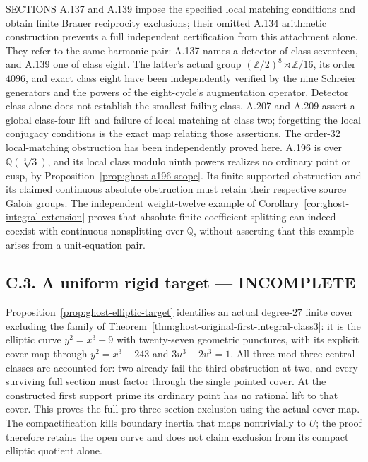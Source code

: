 SECTIONS A.137 and A.139 impose the specified local matching
conditions and obtain finite Brauer reciprocity exclusions;
their omitted A.134 arithmetic construction prevents a full
independent certification from this attachment alone. They
refer to the same harmonic pair: A.137 names a detector of
class seventeen, and A.139 one of class eight. The latter's
actual group \((\mathbb Z/2)^8\rtimes\mathbb Z/16\), its
order \(4096\), and exact class eight have been independently
verified by the nine Schreier generators and the powers of
the eight-cycle's augmentation operator. Detector class alone
does not establish the smallest failing class. A.207
and A.209 assert a global class-four lift and failure of local
matching at class two; forgetting the local conjugacy
conditions is the exact map relating those assertions. The
order-32 local-matching obstruction has been independently
proved here. A.196 is over \(\mathbb Q(\sqrt[3]3)\), and
its local class modulo ninth powers realizes no ordinary
point or cusp, by Proposition~\ref{prop:ghost-a196-scope}.
Its finite supported obstruction and its claimed continuous
absolute obstruction must retain their respective source
Galois groups. The independent weight-twelve example of
Corollary~\ref{cor:ghost-integral-extension} proves that
absolute finite coefficient splitting can indeed coexist with
continuous nonsplitting over \(\mathbb Q\), without asserting
that this example arises from a unit-equation pair.

\subsection*{C.3. A uniform rigid target --- INCOMPLETE}
\label{task:ghost-c3}
Proposition~\ref{prop:ghost-elliptic-target} identifies an
actual degree-\(27\) finite cover excluding the family of
Theorem~\ref{thm:ghost-original-first-integral-class3}:
it is the elliptic curve \(y^2=x^3+9\) with twenty-seven
geometric punctures, with its explicit cover map through
\(y^2=x^3-243\) and \(3u^3-2v^3=1\). All three
mod-three central classes are accounted for: two already
fail the third obstruction at two, and every surviving
full section must factor through the single pointed cover.
At the constructed first support prime its ordinary point
has no rational lift to that cover. This proves the full
pro-three section exclusion using the actual cover map.
The compactification kills boundary inertia that maps
nontrivially to \(U\); the proof therefore retains the
open curve and does not claim exclusion from its compact
elliptic quotient alone.

